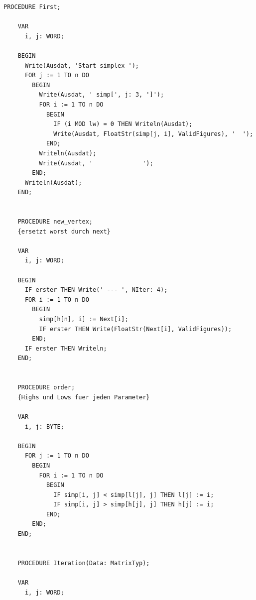 \begin{refsection}
\begin{lstlisting}[caption=Simplex]
    PROCEDURE First;

    VAR
      i, j: WORD;

    BEGIN
      Write(Ausdat, 'Start simplex ');
      FOR j := 1 TO n DO
        BEGIN
          Write(Ausdat, ' simp[', j: 3, ']');
          FOR i := 1 TO n DO
            BEGIN
              IF (i MOD lw) = 0 THEN Writeln(Ausdat);
              Write(Ausdat, FloatStr(simp[j, i], ValidFigures), '  ');
            END;
          Writeln(Ausdat);
          Write(Ausdat, '              ');
        END;
      Writeln(Ausdat);
    END;


    PROCEDURE new_vertex;
    {ersetzt worst durch next}

    VAR
      i, j: WORD;

    BEGIN
      IF erster THEN Write(' --- ', NIter: 4);
      FOR i := 1 TO n DO
        BEGIN
          simp[h[n], i] := Next[i];
          IF erster THEN Write(FloatStr(Next[i], ValidFigures));
        END;
      IF erster THEN Writeln;
    END;


    PROCEDURE order;
    {Highs und Lows fuer jeden Parameter}

    VAR
      i, j: BYTE;

    BEGIN
      FOR j := 1 TO n DO
        BEGIN
          FOR i := 1 TO n DO
            BEGIN
              IF simp[i, j] < simp[l[j], j] THEN l[j] := i;
              IF simp[i, j] > simp[h[j], j] THEN h[j] := i;
            END;
        END;
    END;


    PROCEDURE Iteration(Data: MatrixTyp);

    VAR
      i, j: WORD;


\end{lstlisting}
\end{refsection}
